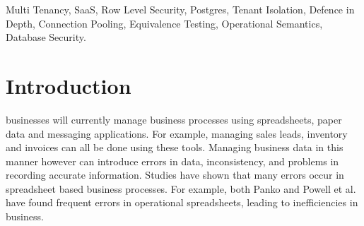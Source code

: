 \documentclass[conference]{IEEEtran}
\begin{document}
\maketitle
\begin{abstract}
Many systems operate using a single-schemas system in order to reduce infrastructure and hosting costs. However, ensuring data isolation between tenants in such systems can be challenging. As data from multiple organisations is stored in the same table, application queries must be designed correctly to ensure isolation. If a query fails to include tenant information, users may be able to view data from other organisations.

In this paper, an investigation of NexusOps was undertaken, an application developed in Spring Boot and Postgres. Two levels of isolation have been applied to ensure tenant data isolation; ORM-based filtering and Row-Level-Security in Postgres. Together these techniques ensure that only records relevant to a particular tenant can be viewed.

The architecture of the system, connection management, security properties and performance of the system was investigated. A transaction scoped connection scheme was introduced to avoid tenant context leaking in a pooled connection. The system was tested in terms of security with automated tests, 16 mutation faults, and performance using 1,000,000 database tuples in Postgres 17. In a concurrency test of 1,000,000 requests with 100 workers, 32 connections and 940,000 tenant context switches, no data leak between tenants was found. Row-Level security in Postgres added overhead to requests of 2.3\%--8.8\% compared to sanitised baselines. Overall, combining ORM filtering and database based security can be useful to provide additional tenant isolation, with acceptable levels of performance overhead.
\end{abstract}

\begin{IEEEkeywords}
Multi Tenancy, SaaS, Row Level Security, Postgres, Tenant Isolation, Defence in Depth, Connection Pooling, Equivalence Testing, Operational Semantics, Database Security.
\end{IEEEkeywords}

\IEEEpeerreviewmaketitle

\section{Introduction}
 businesses will currently manage business processes using spreadsheets, paper data and messaging applications. For example, managing sales leads, inventory and invoices can all be done using these tools. Managing business data in this manner however can introduce errors in data, inconsistency, and problems in recording accurate information. Studies have shown that many errors occur in spreadsheet based business processes. For example, both Panko \cite{panko1998} and Powell et al. \cite{powell2009} have found frequent errors in operational spreadsheets, leading to inefficiencies in business.
\end{document}
